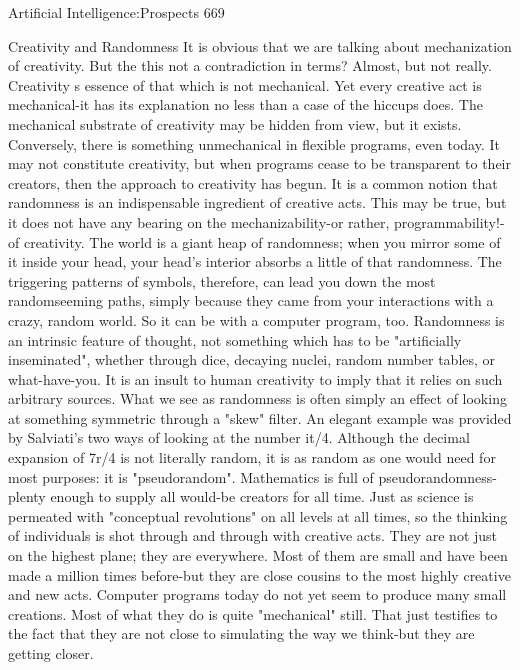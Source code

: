 Artificial Intelligence:Prospects                                                       669

                            Creativity and Randomness
It is obvious that we are talking about mechanization of creativity. But the this not a
contradiction in terms? Almost, but not really. Creativity s essence of that which is not
mechanical. Yet every creative act is mechanical-it has its explanation no less than a case
of the hiccups does. The mechanical substrate of creativity may be hidden from view, but
it exists. Conversely, there is something unmechanical in flexible programs, even today.
It may not constitute creativity, but when programs cease to be transparent to their
creators, then the approach to creativity has begun.
         It is a common notion that randomness is an indispensable ingredient of creative
acts. This may be true, but it does not have any bearing on the mechanizability-or rather,
programmability!-of creativity. The world is a giant heap of randomness; when you
mirror some of it inside your head, your head's interior absorbs a little of that
randomness. The triggering patterns of symbols, therefore, can lead you down the most
randomseeming paths, simply because they came from your interactions with a crazy,
random world. So it can be with a computer program, too. Randomness is an intrinsic
feature of thought, not something which has to be "artificially inseminated", whether
through dice, decaying nuclei, random number tables, or what-have-you. It is an insult to
human creativity to imply that it relies on such arbitrary sources.
         What we see as randomness is often simply an effect of looking at something
symmetric through a "skew" filter. An elegant example was provided by Salviati's two
ways of looking at the number it/4. Although the decimal expansion of 7r/4 is not literally
random, it is as random as one would need for most purposes: it is "pseudorandom".
Mathematics is full of pseudorandomness-plenty enough to supply all would-be creators
for all time.
         Just as science is permeated with "conceptual revolutions" on all levels at all
times, so the thinking of individuals is shot through and through with creative acts. They
are not just on the highest plane; they are everywhere. Most of them are small and have
been made a million times before-but they are close cousins to the most highly creative
and new acts. Computer programs today do not yet seem to produce many small
creations. Most of what they do is quite "mechanical" still. That just testifies to the fact
that they are not close to simulating the way we think-but they are getting closer.
